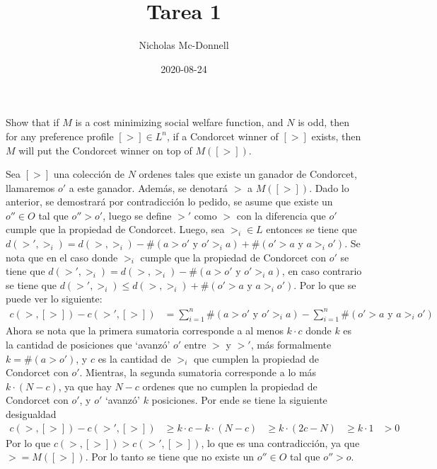 \documentclass{homework}
\title{Tarea 1}
\date{2020-08-24}
\author{Nicholas Mc-Donnell}
\begin{document}
\maketitle
\newpage
{}

\begin{prob}
    Show that if \(M\) is a cost minimizing social welfare function, and \(N\) is odd, then for any preference profile \([>]\in L^n\), if a Condorcet winner of \([>]\) exists, then \(M\) will put the Condorcet winner on top of \(M([>])\).
\end{prob}

\begin{sol}
    Sea \([>]\) una colección de \(N\) ordenes tales que existe un ganador de Condorcet, llamaremos \(o'\) a este ganador. Además, se denotará \(>\) a \(M([>])\). Dado lo anterior, se demostrará por contradicción lo pedido, se asume que existe un \(o''\in O\) tal que \(o''>o'\), luego se define \(>'\) como \(>\) con la diferencia que \(o'\) cumple que la propiedad de Condorcet. Luego, sea \(>_i\in L\) entonces se tiene que \(d(>',>_i)=d(>,>_i)-\#(a>o'\text{ y }o'>_ia)+\#(o'>a\text{ y }a>_io')\). Se nota que en el caso donde \(>_i\) cumple que la propiedad de Condorcet con \(o'\) se tiene que \(d(>',>_i)=d(>,>_i)-\#(a>o'\text{ y }o'>_ia)\), en caso contrario se tiene que \(d(>',>_i)\leq d(>,>_i)+\#(o'>a\text{ y }a>_io')\). Por lo que se puede ver lo siguiente:
    \begin{align*}
        c(>,[>])-c(>',[>])&=\sum_{i=1}^n\#(a>o'\text{ y }o'>_ia)-\sum_{i=1}^n\#(o'>a\text{ y }a>_io')
    \end{align*}
    Ahora se nota que la primera sumatoria corresponde a al menos \(k\cdot c\) donde \(k\) es la cantidad de posiciones que `avanzó' \(o'\) entre \(>\) y \(>'\), más formalmente \(k=\#(a>o')\), y \(c\) es la cantidad de \(>_i\) que cumplen la propiedad de Condorcet con \(o'\). Mientras, la segunda sumatoria corresponde a lo más \(k\cdot (N-c)\), ya que hay \(N-c\) ordenes que no cumplen la propiedad de Condorcet con \(o'\), y \(o'\) `avanzó' \(k\) posiciones. Por ende se tiene la siguiente  desigualdad
    \begin{align*}
        c(>,[>])-c(>',[>])&\geq k\cdot c-k\cdot (N-c)
        &\geq k\cdot (2c-N)
        &\geq k\cdot 1
        &>0
    \end{align*}
    Por lo que \(c(>,[>])>c(>',[>])\), lo que es una contradicción, ya que \(>=M([>])\). Por lo tanto se tiene que no existe un \(o''\in O\) tal que \(o''>o\).
\end{sol}
\end{document}

